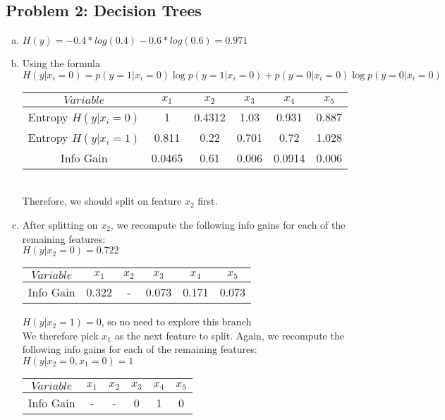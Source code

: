 \documentclass[twoside,11pt]{article}
\theoremstyle{definition}
\begin{document}

\subsection*{Problem 2: Decision Trees}

\begin{enumerate}[(a)]

\item $H(y) = - 0.4 * log(0.4) - 0.6*log(0.6) = 0.971$

\item Using the formula $H(y|x_i = 0) = p(y=1 | x_i = 0) \log p(y=1 | x_i = 0) + p(y=0 | x_i = 0) \log p(y=0 | x_i = 0)$
\begin{tabular}{|c|c|c|c|c|c|}\hline
$Variable$ & $x_1$ & $x_2$ & $x_3$ & $x_4$ & $x_5$ \\
\hline
Entropy $H(y|x_i = 0)$ & 1 & 0.4312 & 1.03 & 0.931 & 0.887 \\
\hline
Entropy $H(y|x_i = 1)$ & 0.811 & 0.22 & 0.701 & 0.72 & 1.028 \\
\hline
Info Gain & 0.0465 & 0.61 & 0.006 & 0.0914 & 0.006 \\
\hline
\end{tabular}
\\ Therefore, we should split on feature $x_2$ first.

\item After splitting on $x_2$, we recompute the following info gains for each of the remaining features: \\
$H(y|x_2=0) = 0.722$ \\
\begin{tabular}{|c|c|c|c|c|c|}\hline
$Variable$ & $x_1$ & $x_2$ & $x_3$ & $x_4$ & $x_5$ \\
\hline
Info Gain & 0.322 & - & 0.073 & 0.171 & 0.073 \\
\hline
\end{tabular}

$H(y|x_2=1) = 0$, so no need to explore this branch \\

We therefore pick $x_1$ as the next feature to split. Again, we recompute the following info gains for each of the remaining features: \\
$H(y|x_2=0, x_1=0) = 1$ \\
\begin{tabular}{|c|c|c|c|c|c|}\hline
$Variable$ & $x_1$ & $x_2$ & $x_3$ & $x_4$ & $x_5$ \\
\hline
Info Gain & - & - & 0 & 1 & 0 \\
\hline
\end{tabular}


\end{enumerate}
\end{document}
